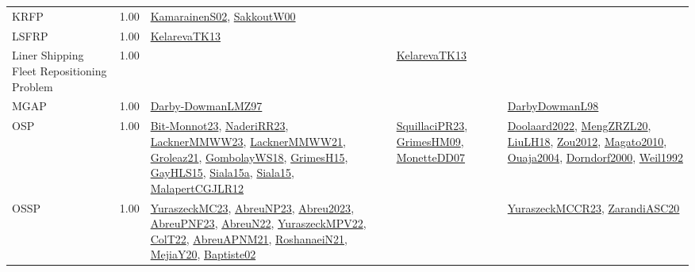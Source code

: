 {\begin{longtable}{p{3cm}r>{\raggedright\arraybackslash}p{6cm}>{\raggedright\arraybackslash}p{6cm}>{\raggedright\arraybackslash}p{8cm}}
\index{KRFP}\index{Classification!KRFP}KRFP &  1.00 & \hyperref[detail:KamarainenS02]{KamarainenS02}, \hyperref[detail:SakkoutW00]{SakkoutW00} &  & \\
\index{LSFRP}\index{Classification!LSFRP}LSFRP &  1.00 & \hyperref[detail:KelarevaTK13]{KelarevaTK13} &  & \\
\index{Liner Shipping Fleet Repositioning Problem}\index{Classification!Liner Shipping Fleet Repositioning Problem}Liner Shipping Fleet Repositioning Problem &  1.00 &  & \hyperref[detail:KelarevaTK13]{KelarevaTK13} & \\
\index{MGAP}\index{Classification!MGAP}MGAP &  1.00 & \hyperref[detail:Darby-DowmanLMZ97]{Darby-DowmanLMZ97} &  & \hyperref[detail:DarbyDowmanL98]{DarbyDowmanL98}\\
\index{OSP}\index{Classification!OSP}OSP &  1.00 & \hyperref[detail:Bit-Monnot23]{Bit-Monnot23}, \hyperref[detail:NaderiRR23]{NaderiRR23}, \hyperref[detail:LacknerMMWW23]{LacknerMMWW23}, \hyperref[detail:LacknerMMWW21]{LacknerMMWW21}, \hyperref[detail:Groleaz21]{Groleaz21}, \hyperref[detail:GombolayWS18]{GombolayWS18}, \hyperref[detail:GrimesH15]{GrimesH15}, \hyperref[detail:GayHLS15]{GayHLS15}, \hyperref[detail:Siala15a]{Siala15a}, \hyperref[detail:Siala15]{Siala15}, \hyperref[detail:MalapertCGJLR12]{MalapertCGJLR12} & \hyperref[detail:SquillaciPR23]{SquillaciPR23}, \hyperref[detail:GrimesHM09]{GrimesHM09}, \hyperref[detail:MonetteDD07]{MonetteDD07} & \hyperref[detail:Doolaard2022]{Doolaard2022}, \hyperref[detail:MengZRZL20]{MengZRZL20}, \hyperref[detail:LiuLH18]{LiuLH18}, \hyperref[detail:Zou2012]{Zou2012}, \hyperref[detail:Magato2010]{Magato2010}, \hyperref[detail:Ouaja2004]{Ouaja2004}, \hyperref[detail:Dorndorf2000]{Dorndorf2000}, \hyperref[detail:Weil1992]{Weil1992}\\
\index{OSSP}\index{Classification!OSSP}OSSP &  1.00 & \hyperref[detail:YuraszeckMC23]{YuraszeckMC23}, \hyperref[detail:AbreuNP23]{AbreuNP23}, \hyperref[detail:Abreu2023]{Abreu2023}, \hyperref[detail:AbreuPNF23]{AbreuPNF23}, \hyperref[detail:AbreuN22]{AbreuN22}, \hyperref[detail:YuraszeckMPV22]{YuraszeckMPV22}, \hyperref[detail:ColT22]{ColT22}, \hyperref[detail:AbreuAPNM21]{AbreuAPNM21}, \hyperref[detail:RoshanaeiN21]{RoshanaeiN21}, \hyperref[detail:MejiaY20]{MejiaY20}, \hyperref[detail:Baptiste02]{Baptiste02} &  & \hyperref[detail:YuraszeckMCCR23]{YuraszeckMCCR23}, \hyperref[detail:ZarandiASC20]{ZarandiASC20}\\

\end{longtable}}

